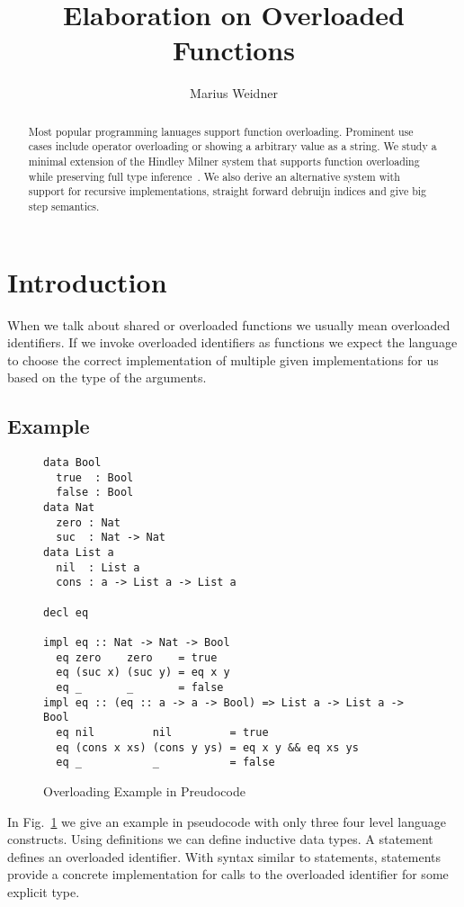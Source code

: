 \documentclass[runningheads]{llncs}
\newcommand{\snip}[1]{\footnotesize{\ttfamily{#1}}}
\begin{document}
\title{Elaboration on Overloaded Functions}
\author{Marius Weidner}
\maketitle

\begin{abstract}
Most popular programming lanuages support function overloading. Prominent use cases include operator overloading or showing a arbitrary value as a string. We study a minimal extension of the Hindley Milner system that supports function overloading while preserving full type inference~\cite{system-o}. We also derive an alternative system with support for recursive implementations, straight forward debruijn indices and give big step semantics.
\end{abstract}

\section{Introduction}
When we talk about shared or overloaded functions we usually mean overloaded identifiers. If we invoke overloaded identifiers as functions we expect the language to choose the correct implementation of multiple given implementations for us based on the type of the arguments.

\subsection{Example}
\begin{figure}
  \begin{lstlisting}
data Bool
  true  : Bool
  false : Bool
data Nat
  zero : Nat
  suc  : Nat -> Nat
data List a
  nil  : List a
  cons : a -> List a -> List a

decl eq

impl eq :: Nat -> Nat -> Bool
  eq zero    zero    = true
  eq (suc x) (suc y) = eq x y
  eq _       _       = false
impl eq :: (eq :: a -> a -> Bool) => List a -> List a -> Bool
  eq nil         nil         = true
  eq (cons x xs) (cons y ys) = eq x y && eq xs ys
  eq _           _           = false
  \end{lstlisting}
  \caption{Overloading Example in Preudocode} \label{example}
\end{figure}
\noindent In Fig.~\ref{example} we give an example in pseudocode with only three four level language constructs. Using \snip{data} definitions we can define inductive data types. A \snip{delc} statement defines an overloaded identifier. With syntax similar to \snip{let} statements, \snip{impl} statements provide a concrete implementation for calls to the overloaded identifier for some explicit type. 
\end{document}
